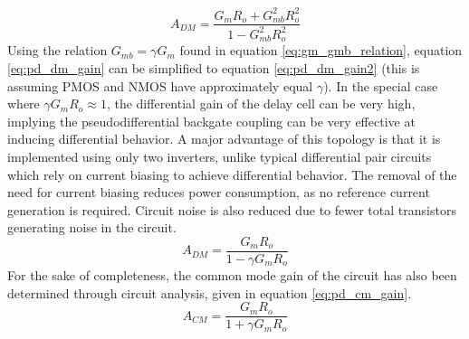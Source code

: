 			\begin{equation}\label{eq:pd_dm_gain}
				A_{DM} = \frac{G_mR_o + G_{mb}^2R_o^2}{1 - G_{mb}^2R_o^2}
			\end{equation}
			Using the relation $G_{mb} = \gamma G_{m}$ found in equation \ref{eq:gm_gmb_relation}, equation \ref{eq:pd_dm_gain} can be simplified to equation \ref{eq:pd_dm_gain2} (this is assuming PMOS and NMOS have approximately equal $\gamma$). In the special case where $\gamma G_mR_o \approx 1$, the differential gain of the delay cell can be very high, implying the pseudodifferential backgate coupling can be very effective at inducing differential behavior. A major advantage of this topology is that it is implemented using only two inverters, unlike typical differential pair circuits which rely on current biasing to achieve differential behavior. The removal of the need for current biasing reduces power consumption, as no reference current generation is required. Circuit noise is also reduced due to fewer total transistors generating noise in the circuit.
			\begin{equation}\label{eq:pd_dm_gain2}
				A_{DM} = \frac{G_mR_o }{1 - \gamma G_mR_o }
			\end{equation}
			For the sake of completeness, the common mode gain of the circuit has also been determined through circuit analysis, given in equation \ref{eq:pd_cm_gain}.
			\begin{equation}\label{eq:pd_cm_gain}
				A_{CM} = \frac{G_mR_o }{1 + \gamma G_mR_o }
			\end{equation}




			\FloatBarrier
